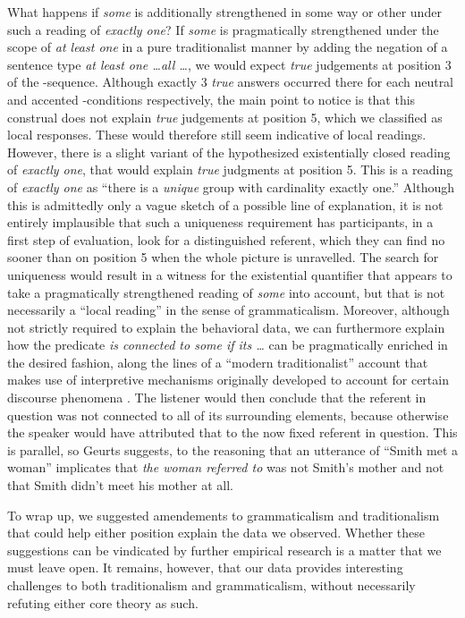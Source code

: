 \documentclass[fleqn,reqno,10pt]{article}
\renewcommand{\es}{\acro{es}}
\begin{document}
What happens if \emph{some} is additionally strengthened in some way
or other under such a reading of \emph{exactly one}? If \emph{some} is
pragmatically strengthened under the scope of \emph{at least one} in a
pure traditionalist manner by adding the negation of a sentence type
\emph{at least one \dots all \dots}, we would expect \emph{true}
judgements at position 3 of the \es-sequence. Although exactly 3
\emph{true} answers occurred there for each neutral and accented
\es-conditions respectively, the main point to notice is that this
construal does not explain \emph{true} judgements at position 5, which
we classified as local responses. These would therefore still seem
indicative of local readings. However, there is a slight variant of
the hypothesized existentially closed reading of \emph{exactly one},
that would explain \emph{true} judgments at position 5. This is a
reading of \emph{exactly one} as ``there is a \emph{unique} group with
cardinality exactly one.''  Although this is admittedly only a vague
sketch of a possible line of explanation, it is not entirely
implausible that such a uniqueness requirement has participants, in a
first step of evaluation, look for a distinguished referent, which
they can find no sooner than on position 5 when the whole picture is
unravelled. The search for uniqueness would result in a witness for
the existential quantifier that appears to take a pragmatically
strengthened reading of \emph{some} into account, but that is not
necessarily a ``local reading'' in the sense of
grammaticalism. Moreover, although not strictly required to explain
the behavioral data, we can furthermore explain how the predicate
\emph{is connected to some if its \dots} can be pragmatically enriched
in the desired fashion, along the lines of a ``modern traditionalist''
account that makes use of interpretive mechanisms originally developed
to account for certain discourse phenomena
\citep[][Chapter~8.4]{Geurts2010:Quantity-Implic}. The listener would
then conclude that the referent in question was not connected to all
of its surrounding elements, because otherwise the speaker would have
attributed that to the now fixed referent in question. This is
parallel, so Geurts suggests, to the reasoning that an utterance of
``Smith met a woman'' implicates that \emph{the woman referred to} was
not Smith's mother and not that Smith didn't meet his mother at all.

To wrap up, we suggested amendements to grammaticalism and
traditionalism that could help either position explain the data we
observed. Whether these suggestions can be vindicated by further
empirical research is a matter that we must leave open. It remains,
however, that our data provides interesting challenges to both
traditionalism and grammaticalism, without necessarily refuting either
core theory as such.
\end{document}
